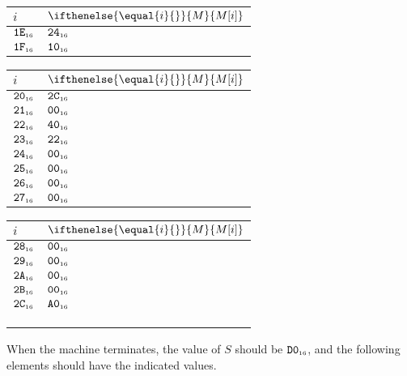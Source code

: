 \documentclass[a4paper,12pt]{article}
\makeatletter
\newcommand{\num}[1]{\texttt{#1}}
\newcommand{\hex}[1]{\num{#1}_{\textup{\tiny 16}}}
\newcommand{\MEM}[1]{\ifthenelse{\equal{#1}{}}{M}{M[#1]}}
\newcommand{\SP}{S}
\newenvironment{memtable}{%
  \begin{trivlist}
    \item
    }{%
    \end{trivlist}}
\newenvironment{memcolumn}{%
  \begin{tabular}{@{}ll@{}}
    $i$ & $\MEM{i}$ \\
    \hline}
    {%
    \hline
  \end{tabular}}
\newcommand{\memspace}{\qquad}
\makeatother
\begin{document}
\begin{memtable}
\begin{memcolumn}
    $\hex{1E}$ & $\hex{24}$ \\
    $\hex{1F}$ & $\hex{10}$ \\
  \end{memcolumn}
  \memspace
  \begin{memcolumn}
    $\hex{20}$ & $\hex{2C}$ \\
    $\hex{21}$ & $\hex{00}$ \\
    $\hex{22}$ & $\hex{40}$ \\
    $\hex{23}$ & $\hex{22}$ \\
    $\hex{24}$ & $\hex{00}$ \\
    $\hex{25}$ & $\hex{00}$ \\
    $\hex{26}$ & $\hex{00}$ \\
    $\hex{27}$ & $\hex{00}$ \\
  \end{memcolumn}
  \memspace
  \begin{memcolumn}
    $\hex{28}$ & $\hex{00}$ \\
    $\hex{29}$ & $\hex{00}$ \\
    $\hex{2A}$ & $\hex{00}$ \\
    $\hex{2B}$ & $\hex{00}$ \\
    $\hex{2C}$ & $\hex{A0}$ \\
    \\
    \\
    \\
  \end{memcolumn}
\end{memtable}
When the machine terminates, the value of $\SP$ should be $\hex{D0}$, and the following elements should have the indicated values.
\end{document}
